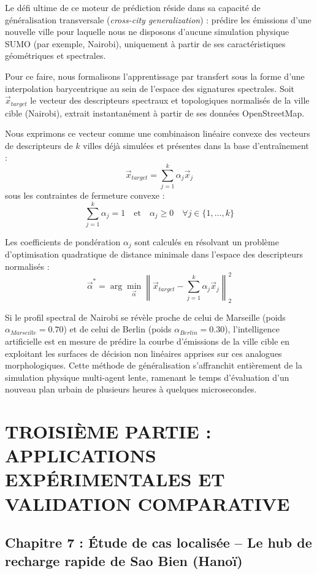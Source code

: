 \documentclass[10pt, a4paper]{article}
\begin{document}
Le défi ultime de ce moteur de prédiction réside dans sa capacité de
généralisation transversale (\emph{cross-city generalization}) : prédire
les émissions d'une nouvelle ville pour laquelle nous ne disposons
d'aucune simulation physique SUMO (par exemple, Nairobi), uniquement à
partir de ses caractéristiques géométriques et spectrales.

Pour ce faire, nous formalisons l'apprentissage par transfert sous la
forme d'une interpolation barycentrique au sein de l'espace des
signatures spectrales. Soit \(\vec{x}_{target}\) le vecteur des
descripteurs spectraux et topologiques normalisés de la ville cible
(Nairobi), extrait instantanément à partir de ses données OpenStreetMap.

Nous exprimons ce vecteur comme une combinaison linéaire convexe des
vecteurs de descripteurs de \(k\) villes déjà simulées et présentes dans
la base d'entraînement :
\[\vec{x}_{target} = \sum_{j=1}^k \alpha_j \vec{x}_j\] sous les
contraintes de fermeture convexe :
\[\sum_{j=1}^k \alpha_j = 1 \quad \text{et} \quad \alpha_j \ge 0 \quad \forall j \in \{1, \dots, k\}\]

Les coefficients de pondération \(\alpha_j\) sont calculés en résolvant
un problème d'optimisation quadratique de distance minimale dans
l'espace des descripteurs normalisés :
\[\vec{\alpha}^* = \arg\min_{\vec{\alpha}} \left\| \vec{x}_{target} - \sum_{j=1}^k \alpha_j \vec{x}_j \right\|_2^2\]

Si le profil spectral de Nairobi se révèle proche de celui de Marseille
(poids \(\alpha_{Marseille} = 0.70\)) et de celui de Berlin (poids
\(\alpha_{Berlin} = 0.30\)), l'intelligence artificielle est en mesure
de prédire la courbe d'émissions de la ville cible en exploitant les
surfaces de décision non linéaires apprises sur ces analogues
morphologiques. Cette méthode de généralisation s'affranchit entièrement
de la simulation physique multi-agent lente, ramenant le temps
d'évaluation d'un nouveau plan urbain de plusieurs heures à quelques
microsecondes.

\newpage

\section{TROISIÈME PARTIE : APPLICATIONS EXPÉRIMENTALES ET VALIDATION
COMPARATIVE}\label{troisiuxe8me-partie-applications-expuxe9rimentales-et-validation-comparative}

\subsection{Chapitre 7 : Étude de cas localisée -- Le hub de recharge
rapide de Sao Bien
(Hanoï)}\label{chapitre-7-uxe9tude-de-cas-localisuxe9e-le-hub-de-recharge-rapide-de-sao-bien-hanouxef}
\end{document}
